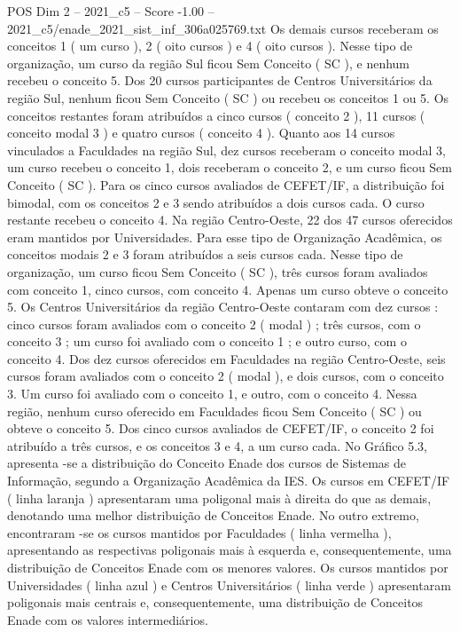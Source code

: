 \begin{textsample}{POS Dim 2 – 2021\_c5 – Score -1.00 – 2021\_c5/enade\_2021\_sist\_inf\_306a025769.txt}
Os demais cursos receberam os conceitos 1 ( um curso ), 2 ( oito cursos ) e 4 ( oito cursos ).
Nesse tipo de organização, um curso da região Sul ficou Sem Conceito ( SC ), e nenhum recebeu o conceito 5.
Dos 20 cursos participantes de Centros Universitários da região Sul, nenhum ficou Sem Conceito ( SC ) ou recebeu os conceitos 1 ou 5.
Os conceitos restantes foram atribuídos a cinco cursos ( conceito 2 ), 11 cursos ( conceito modal 3 ) e quatro cursos ( conceito 4 ).
Quanto aos 14 cursos vinculados a Faculdades na região Sul, dez cursos receberam o conceito modal 3, um curso recebeu o conceito 1, dois receberam o conceito 2, e um curso ficou Sem Conceito ( SC ).
Para os cinco cursos avaliados de CEFET/IF, a distribuição foi bimodal, com os conceitos 2 e 3 sendo atribuídos a dois cursos cada.
O curso restante recebeu o conceito 4.
Na região Centro-Oeste, 22 dos 47 cursos oferecidos eram mantidos por Universidades.
Para esse tipo de Organização Acadêmica, os conceitos modais 2 e 3 foram atribuídos a seis cursos cada.
Nesse tipo de organização, um curso ficou Sem Conceito ( SC ), três cursos foram avaliados com conceito 1, cinco cursos, com conceito 4.
Apenas um curso obteve o conceito 5.
Os Centros Universitários da região Centro-Oeste contaram com dez cursos : cinco cursos foram avaliados com o conceito 2 ( modal ) ; três cursos, com o conceito 3 ; um curso foi avaliado com o conceito 1 ; e outro curso, com o conceito 4.
Dos dez cursos oferecidos em Faculdades na região Centro-Oeste, seis cursos foram avaliados com o conceito 2 ( modal ), e dois cursos, com o conceito 3.
Um curso foi avaliado com o conceito 1, e outro, com o conceito 4.
Nessa região, nenhum curso oferecido em Faculdades ficou Sem Conceito ( SC ) ou obteve o conceito 5.
Dos cinco cursos avaliados de CEFET/IF, o conceito 2 foi atribuído a três cursos, e os conceitos 3 e 4, a um curso cada.
No Gráfico 5.3, apresenta -se a distribuição do Conceito Enade dos cursos de Sistemas de Informação, segundo a Organização Acadêmica da IES.
Os cursos em CEFET/IF ( linha laranja ) apresentaram uma poligonal mais à direita do que as demais, denotando uma melhor distribuição de Conceitos Enade.
No outro extremo, encontraram -se os cursos mantidos por Faculdades ( linha vermelha ), apresentando as respectivas poligonais mais à esquerda e, consequentemente, uma distribuição de Conceitos Enade com os menores valores.
Os cursos mantidos por Universidades ( linha azul ) e Centros Universitários ( linha verde ) apresentaram poligonais mais centrais e, consequentemente, uma distribuição de Conceitos Enade com os valores intermediários.

\end{textsample}
